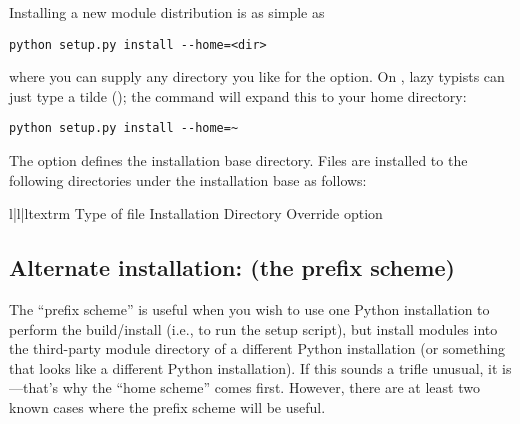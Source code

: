 \documentclass{howto}
\begin{document}
Installing a new module distribution is as simple as

\begin{verbatim}
python setup.py install --home=<dir>
\end{verbatim}

where you can supply any directory you like for the
 option.  On \UNIX, lazy typists can just type a
tilde (\code{\textasciitilde}); the  command will
expand this to your home directory:

\begin{verbatim}
python setup.py install --home=~
\end{verbatim}

The  option defines the installation base
directory.  Files are installed to the following directories under the
installation base as follows:
\begin{tableiii}{l|l|l}{textrm}
          {Type of file}
          {Installation Directory}
          {Override option}
             {}
             {}
             {}
             {}
             {}
             {}
             {}
             {}
\end{tableiii}




\subsection{Alternate installation: \UNIX{} (the prefix scheme)}
\label{alt-install-home}

The ``prefix scheme'' is useful when you wish to use one Python
installation to perform the build/install (i.e., to run the setup
script), but install modules into the third-party module directory of a
different Python installation (or something that looks like a different
Python installation).  If this sounds a trifle unusual, it is---that's
why the ``home scheme'' comes first.  However, there are at least two
known cases where the prefix scheme will be useful.
\end{document}
